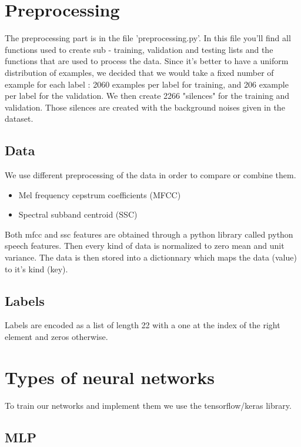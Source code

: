 \section{Preprocessing}

The preprocessing part is in the file 'preprocessing.py'. In this file you'll find all functions used to create sub - training, validation and testing lists and the functions that are used to process the data. Since it's better to have a uniform distribution of examples, we decided that we would take a fixed number of example for each label : 2060 examples per label for training, and 206 example per label for the validation. We then create 2266 "silences" for the training and validation. Those silences are created with the background noises given in the dataset.

\subsection{Data}

We use different preprocessing of the data in order to compare or combine them. 

\begin{itemize}
    \item Mel frequency cepstrum coefficients (MFCC)
    \item Spectral subband centroid (SSC)
\end{itemize}

Both mfcc and ssc features are obtained through a python library called python speech features. Then every kind of data is normalized to zero mean and unit variance. The data is then stored into a dictionnary which maps the data (value) to it's kind (key).

\subsection{Labels}

Labels are encoded as a list of length 22 with a one at the index of the right element and zeros otherwise.

\section{Types of neural networks}

To train our networks and implement them we use the tensorflow/keras library. 

\newpage

\subsection{MLP}

